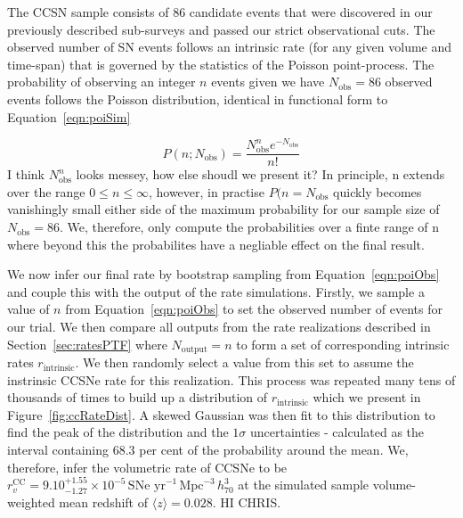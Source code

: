 \documentclass[a4paper,fleqn,usenatbib]{mnras}
\newcommand{\chris}[1]{\color{orange}#1\color{black}}
\begin{document}
The CCSN sample consists of 86 candidate events that were discovered in our previously described sub-surveys and passed our strict observational cuts. The observed number of SN events follows an intrinsic rate (for any given volume and time-span) that is governed by the statistics of the Poisson point-process. The probability of observing an integer $n$ events given we have $N_\mathrm{obs}=86$ observed events follows the Poisson distribution, identical in functional form to Equation~\ref{eqn:poiSim} 

\begin{equation}
    P(n; N_\mathrm{obs})=\frac{N_\mathrm{obs}^{n} e^{-N_\mathrm{obs}}}{n!}
    \label{eqn:poiObs}
\end{equation}
\chris{I think $N_\mathrm{obs}^{n}$ looks messey, how else shoudl we present it?}
In principle, n extends over the range $0 \le n \le \infty$, however, in practise $P(n=N_\mathrm{obs}$ quickly becomes vanishingly small either side of the maximum probability for our sample size of $N_\mathrm{obs}=86$. We, therefore, only compute the probabilities over a finte range of n where beyond this the probabilites have a negliable effect on the final result.

We now infer our final rate by bootstrap sampling from Equation~\ref{eqn:poiObs} and couple this with the output of the rate simulations. Firstly, we sample a value of $n$ from Equation~\ref{eqn:poiObs} to set the observed number of events for our trial. We then compare all outputs from the rate realizations described in Section~\ref{sec:ratesPTF} where $N_\mathrm{output} =  n$ to form a set of corresponding intrinsic rates $r_\mathrm{intrinsic}$. We then randomly select a value from this set to assume the instrinsic CCSNe rate for this realization. This process was repeated many tens of thousands of times to build up a distribution of $r_\mathrm{intrinsic}$ which we present in Figure~\ref{fig:ccRateDist}. A skewed Gaussian was then fit to this distribution to find the peak of the distribution and the $1\sigma$ uncertainties - calculated as the interval containing 68.3 per cent of the probability around the mean. We, therefore, infer the volumetric rate of CCSNe to be $r^\mathrm{CC}_v=9.10_{-1.27}^{+1.55}\times10^{-5}\,\text{SNe yr}^{-1}\,\text{Mpc}^{-3}\, h_{70}^{3}$ at the simulated sample volume-weighted mean redshift of $ \langle z \rangle = 0.028$. HI CHRIS.
\end{document}
